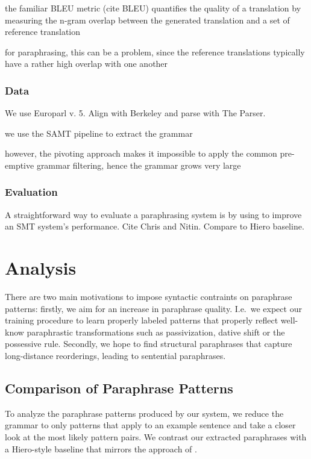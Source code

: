 \documentclass[11pt]{article}
\newcommand{\mnote}[1]{\marginpar{%
  \vskip-\baselineskip
  \raggedright\footnotesize
  \itshape\hrule\smallskip\tiny{#1}\par\smallskip\hrule}}
\begin{document}
the familiar BLEU metric (cite BLEU) quantifies the quality of a
translation by measuring the n-gram overlap between the generated
translation and a set of  reference translation

for paraphrasing, this can be a problem, since the reference
translations typically have a rather high overlap with one another
\mnote{get some numbers to back that up}


\subsubsection{Data} \label{data}

We use Europarl v. 5. Align with Berkeley and parse with The Parser.

we use the SAMT pipeline to extract the grammar

however, the pivoting approach makes it impossible to apply the common pre-emptive
grammar filtering, hence the grammar grows very large

\subsubsection{Evaluation} \label{evaluation}

A straightforward way to evaluate a paraphrasing system is by using to
improve an SMT system's performance. Cite Chris and Nitin. Compare to
Hiero baseline.



\section{Analysis} \label{analysis}

There are two main motivations to impose syntactic contraints on
paraphrase patterns: firstly, we aim for an increase in paraphrase
quality. I.e.\ we expect our training procedure to learn properly
labeled patterns that properly reflect well-know paraphrastic
transformations such as passivization, dative shift or the possessive
rule. Secondly, we hope to find structural paraphrases that capture
long-distance reorderings, leading to sentential paraphrases.

\subsection{Comparison of Paraphrase
  Patterns} \label{pattern_comparison}

To analyze the paraphrase patterns produced by our system, we reduce
the grammar to only patterns that apply to an example sentence and
take a closer look at the most likely pattern pairs. We contrast our
extracted paraphrases with a Hiero-style baseline that mirrors the
approach of . 
\end{document}
